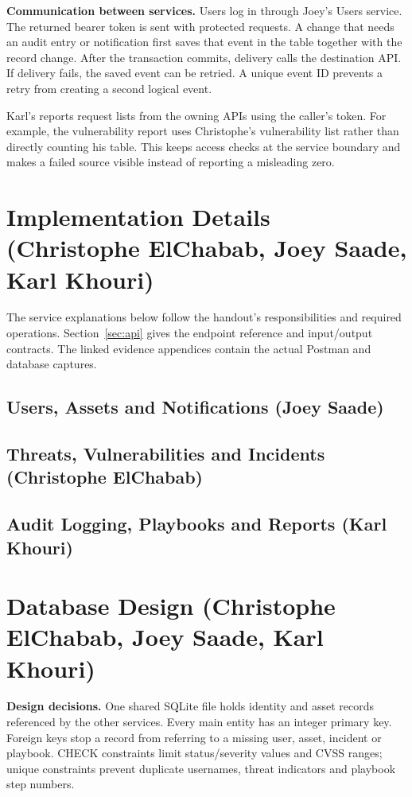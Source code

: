 \documentclass[11pt,a4paper]{article}
\begin{document}
\textbf{Communication between services.} Users log in through Joey's Users service. The returned bearer token is sent with protected requests. A change that needs an audit entry or notification first saves that event in the  table together with the record change. After the transaction commits, delivery calls the destination API. If delivery fails, the saved event can be retried. A unique event ID prevents a retry from creating a second logical event.

Karl's reports request lists from the owning APIs using the caller's token. For example, the vulnerability report uses Christophe's vulnerability list rather than directly counting his table. This keeps access checks at the service boundary and makes a failed source visible instead of reporting a misleading zero.

\section{Implementation Details (Christophe ElChabab, Joey Saade, Karl Khouri)}
\label{sec:implementation}
The service explanations below follow the handout's responsibilities and required operations. Section~\ref{sec:api} gives the endpoint reference and input/output contracts. The linked evidence appendices contain the actual Postman and database captures.
\subsection{Users, Assets and Notifications (Joey Saade)}

\subsection{Threats, Vulnerabilities and Incidents (Christophe ElChabab)}

\subsection{Audit Logging, Playbooks and Reports (Karl Khouri)}



\section{Database Design (Christophe ElChabab, Joey Saade, Karl Khouri)}
\label{sec:database}
\textbf{Design decisions.} One shared SQLite file holds identity and asset records referenced by the other services. Every main entity has an integer primary key. Foreign keys stop a record from referring to a missing user, asset, incident or playbook. CHECK constraints limit status/severity values and CVSS ranges; unique constraints prevent duplicate usernames, threat indicators and playbook step numbers.
\end{document}
